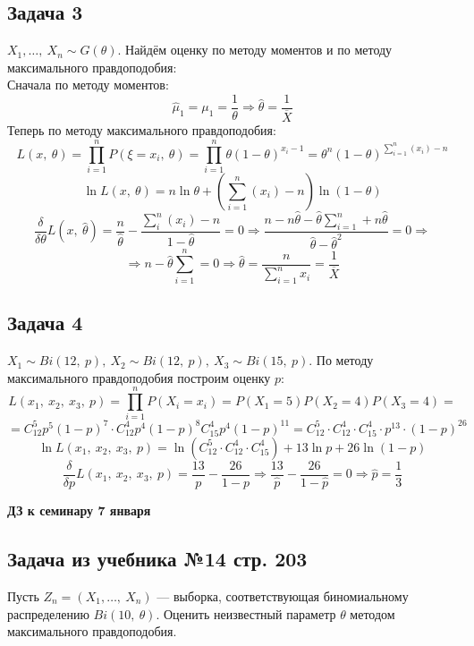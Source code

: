 \documentclass[12pt, a4paper]{article}
\begin{document}
\subsection*{Задача 3}
$X_1,\dots,\ X_n \sim G(\theta)$. Найдём оценку по методу моментов и по методу максимального правдоподобия:\\
Сначала по методу моментов:
\[\hat{\mu}_1 = \mu_1 = \frac{1}{\theta}\Rightarrow \hat{\theta} = \frac{1}{\overline{X}}\]
Теперь по методу максимального правдоподобия:
\[L(x,\ \theta) = \prod_{i = 1}^n P(\xi = x_i,\ \theta) = \prod_{i = 1}^n \theta(1 - \theta)^{x_i - 1} = \theta^n (1 - \theta)^{\sum_{i = 1}^{n} (x_i) - n}\]
\[\ln L(x,\ \theta) = n \ln \theta + \left(\sum_{i = 1}^{n} (x_i) - n\right) \ln(1 - \theta)\]
\[\frac{\delta }{ \delta \theta} L(x,\ \hat\theta) = \frac{n}{\hat\theta} - \frac{\sum_{i}^{n} (x_i) - n}{1 - \hat\theta} = 0\Rightarrow \frac{n - n\hat\theta - \hat\theta\sum_{i = 1}^{n} + n\hat\theta}{\hat\theta - \hat\theta^2} = 0 \Rightarrow\]
\[\Rightarrow n - \hat\theta \sum_{i = 1}^{n} = 0\Rightarrow \hat\theta = \frac{n}{\sum_{i  =1}^{n}x_i} = \frac{1}{\overline{X}}\]
\subsection*{Задача 4}
$X_1 \sim Bi(12,\ p),\ X_2 \sim Bi(12,\ p),\ X_3 \sim Bi(15,\ p)$. По методу максимального правдоподобия построим оценку $p$:
\[L(x_1,\ x_2,\ x_3,\ p) = \prod_{i = 1}^{n} P(X_i = x_i) = P(X_1 = 5) P(X_2 = 4) P(X_3 = 4) =\]
\[ = C^5_{12} p^5 (1 - p)^7 \cdot C^4_{12} p^4 (1 - p)^8 C^4_{15} p^4 (1 - p)^{11} = C^5_{12}\cdot C^4_{12} \cdot C^4_{15} \cdot p^{13}\cdot (1 - p)^{26}\]
\[\ln L(x_1,\ x_2,\ x_3,\ p) = \ln (C^5_{12}\cdot C^4_{12} \cdot C^4_{15}) + 13 \ln p + 26 \ln (1 - p)\]
\[\frac{\delta}{\delta p} L(x_1,\ x_2,\ x_3,\ p) = \frac{13}{p} - \frac{26}{1 - p}\Rightarrow \frac{13}{\hat p} - \frac{26}{1 - \hat p} = 0\Rightarrow \hat p = \frac{1}{3}\]

\begin{center}
    \bf ДЗ к семинару 7 января
\end{center}

\subsection*{Задача из учебника №14 стр. 203}
Пусть $Z_n = (X_1,\dots,\ X_n)$ --- выборка, соответствующая биномиальному распределению $Bi(10,\ \theta)$. Оценить неизвестный параметр $\theta$ методом максимального правдоподобия.\\
\end{document}
